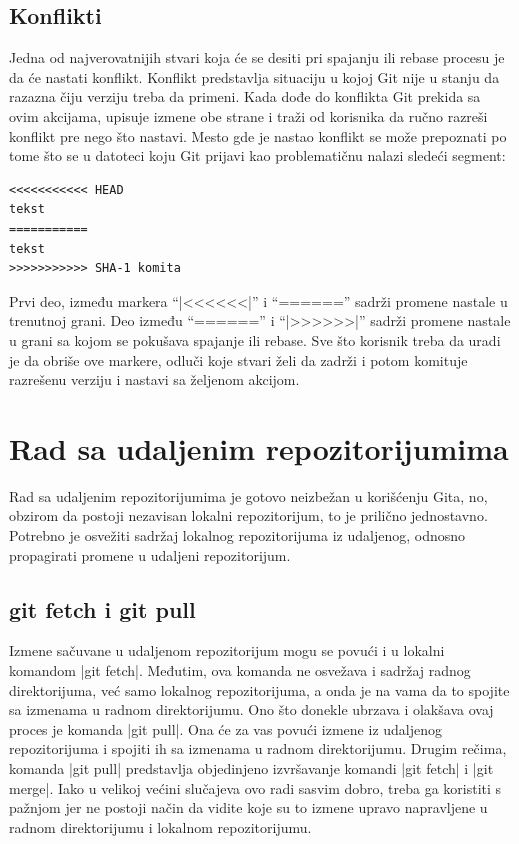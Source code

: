 \documentclass[a4paper]{article}
\begin{document}
{\subsection{Konflikti}
\label{subsec:konflikti}
Jedna od najverovatnijih stvari koja će se desiti pri spajanju ili rebase procesu je da će nastati konflikt. Konflikt predstavlja situaciju u kojoj Git nije u stanju da razazna čiju verziju treba da primeni. Kada dođe do konflikta Git prekida sa ovim akcijama, upisuje izmene obe strane i traži od korisnika da ručno razreši konflikt pre nego što nastavi. Mesto gde je nastao konflikt se može prepoznati po tome što se u datoteci koju Git prijavi kao problematičnu nalazi sledeći segment:
\begin{lstlisting}
<<<<<<<<<<< HEAD
tekst
===========
tekst
>>>>>>>>>>> SHA-1 komita
\end{lstlisting}
Prvi deo, između markera ``|<<<<<<|'' i ``======'' sadrži promene nastale u trenutnoj grani. Deo između  ``======'' i ``|>>>>>>|'' sadrži promene nastale u grani sa kojom se pokušava spajanje ili rebase. Sve što korisnik treba da uradi je da obriše ove markere, odluči koje stvari želi da zadrži i potom komituje razrešenu verziju i nastavi sa željenom akcijom.
\section{Rad sa udaljenim repozitorijumima}
\label{sec:udaljeni_repozitorijumi}
Rad sa udaljenim repozitorijumima je gotovo neizbežan u korišćenju Gita, no, obzirom da postoji nezavisan lokalni repozitorijum, to je prilično jednostavno. Potrebno je osvežiti sadržaj lokalnog repozitorijuma iz udaljenog, odnosno propagirati promene u udaljeni repozitorijum.


\subsection{git fetch i git pull}
\label{subsec:git_pull}
Izmene sačuvane u udaljenom repozitorijum mogu se povući i u lokalni komandom |git fetch|. Međutim, ova komanda ne osvežava i sadržaj radnog direktorijuma, već samo lokalnog repozitorijuma, a onda je na vama da to spojite sa izmenama u radnom direktorijumu. Ono što donekle ubrzava i olakšava ovaj proces je komanda |git pull|. Ona će za vas povući izmene iz udaljenog repozitorijuma i spojiti ih sa izmenama u radnom direktorijumu. Drugim rečima, komanda |git pull| predstavlja objedinjeno izvršavanje komandi |git fetch| i |git merge|. Iako u velikoj većini slučajeva ovo radi sasvim dobro, treba ga koristiti s pažnjom jer ne postoji način da vidite koje su to izmene upravo napravljene u radnom direktorijumu i lokalnom repozitorijumu.




}
\end{document}
